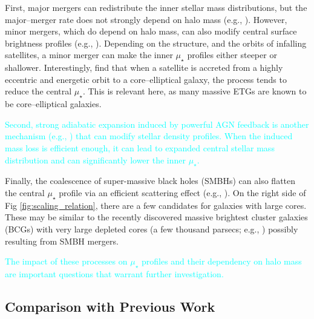 \documentclass[a4paper,fleqn,usenatbib]{mnras}
\def\mden{{$\mu_{\star}$}}
\newcommand{\song}[1]{\textcolor{cyan}{#1}}
\begin{document}
    First, major mergers can redistribute the inner stellar mass distributions, but 
    the major--merger rate does not strongly depend on halo mass 
    (e.g., \citealt{Shankar2014}). 
    However, minor mergers, which do depend on halo mass, can also modify central 
    surface brightness profiles (e.g., \citealt{BoylanKolchin2007}). 
    Depending on the structure, and the orbits of infalling satellites, a minor merger 
    can make the inner \mden{} profiles either steeper or shallower.  
    Interestingly, \citet{BoylanKolchin2007} find that when a satellite is accreted 
    from a highly eccentric and energetic orbit to a core--elliptical galaxy, the 
    process tends to reduce the central \mden{}.  
    This is relevant here, as many massive ETGs are known to be core--elliptical 
    galaxies. 
    
    \song{
    Second, strong adiabatic expansion induced by powerful AGN feedback is 
    another mechanism (e.g., \citealt{Fan2008, Martizzi2013}) that can modify stellar 
    density profiles. 
    When the induced mass loss is efficient enough, it can lead to expanded 
    central stellar mass distribution and can significantly lower the inner \mden{}. 
    }
    
    Finally, the coalescence of super-massive black holes (SMBHs) can also flatten 
    the central \mden{} profile via an efficient scattering effect 
    (e.g., \citealt{Milosavljevi2002}).
    On the right side of Fig \ref{fig:scaling_relation}, there are a few candidates 
    for galaxies with large cores. 
    These may be similar to the recently discovered massive brightest cluster galaxies 
    (BCGs) with very large depleted cores (a few thousand parsecs; e.g., 
    \citealt{Postman2012, LopezCruz2014, Thomas2016, Bonfini2016}) possibly resulting 
    from SMBH mergers.
    
    \song{
    The impact of these processes on \mden{} profiles and their dependency on 
    halo mass are important questions that warrant further investigation.}


\subsection{Comparison with Previous Work} 
\end{document}

